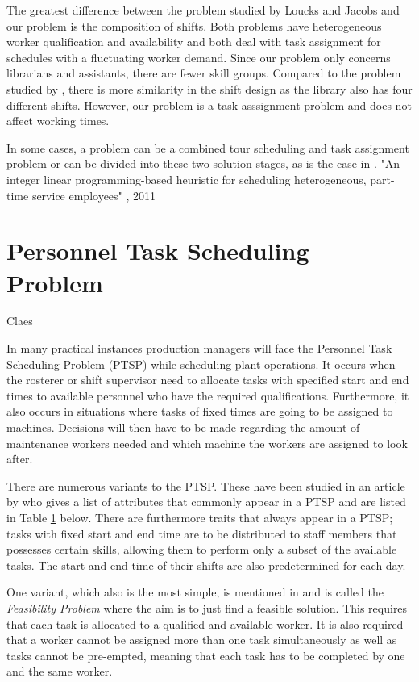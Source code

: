 The greatest difference between the problem studied by Loucks and Jacobs and our problem is the composition of shifts. Both problems have heterogeneous worker qualification and availability and both deal with task assignment for schedules with a fluctuating worker demand. Since our problem only concerns librarians and assistants, there are fewer skill groups. Compared to the problem studied by \cite{choi_hwang_park_2009}, there is more similarity in the shift design as the library also has four different shifts. However, our problem is a task asssignment problem and does not affect working times. 

In some cases, a problem can be a combined tour scheduling and task assignment problem or can be divided into these two solution stages, as is the case in \cite{keylist}. "An integer linear programming-based heuristic for scheduling heterogeneous, part-time service employees" , 2011


\section{Personnel Task Scheduling Problem} \label{PTSP}
Claes

In many practical instances production managers will face the Personnel Task Scheduling Problem (PTSP) while scheduling plant operations. It occurs when the rosterer or shift supervisor need to allocate tasks with specified start and end times to available personnel who have the required qualifications. Furthermore, it also occurs in situations where tasks of fixed times are going to be assigned to machines. Decisions will then have to be made regarding the amount of maintenance workers needed and which machine the workers are assigned to look after. \cite{krishnamoorthy_2001}

There are numerous variants to the PTSP. These have been studied in an article by \cite{krishnamoorthy_2001} who gives a list of attributes that commonly appear in a PTSP and are listed in Table \ref{PTSP} below. There are furthermore traits that always appear in a PTSP; tasks with fixed start and end time are to be distributed to staff members that possesses certain skills, allowing them to perform only a subset of the available tasks. The start and end time of their shifts are also predetermined for each day.

One variant, which also is the most simple, is mentioned in \cite{krishnamoorthy_2001} and is called the \textit{Feasibility Problem} where the aim is to just find a feasible solution. This requires that each task is allocated to a qualified and available worker. It is also required that a worker cannot be assigned more than one task simultaneously as well as tasks cannot be pre-empted, meaning that each task has to be completed by one and the same worker.


